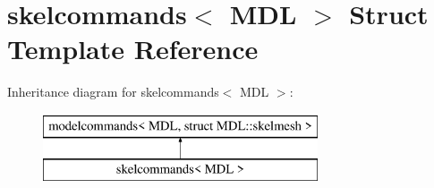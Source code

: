 \hypertarget{structskelcommands}{}\section{skelcommands$<$ M\+DL $>$ Struct Template Reference}
\label{structskelcommands}
Inheritance diagram for skelcommands$<$ M\+DL $>$\+:\begin{figure}[H]
\begin{center}
\leavevmode
\includegraphics[height=2.000000cm]{structskelcommands}
\end{center}
\end{figure}
